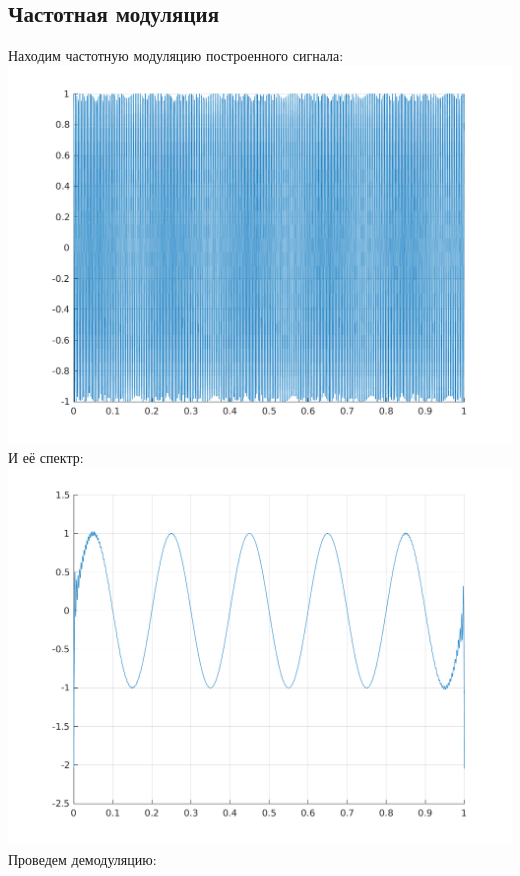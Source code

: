 \documentclass[a4paper]{article}
\begin{document}
\subsection{Частотная модуляция}
Находим частотную модуляцию построенного сигнала:
\\
\includegraphics[scale=0.7]{lab5/figures/figure_4.png}\\
И её спектр:\\
\includegraphics[scale=0.7]{lab5/figures/figure_5.png}\\
Проведем демодуляцию:
\\
\end{document}

